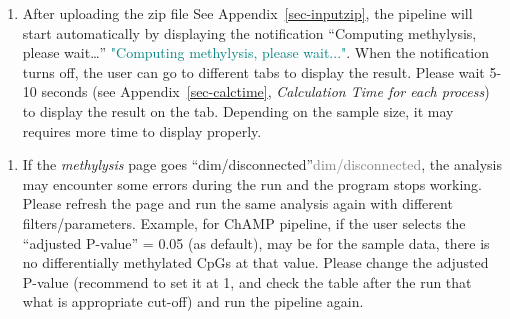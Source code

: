 \documentclass[
  a4paper,
  DIV=11,
  numbers=noendperiod,
  oneside,
  open=any]{scrreport}
\providecommand{\tightlist}{%
  \setlength{\itemsep}{0pt}\setlength{\parskip}{0pt}}\usepackage{longtable,booktabs,array}
\begin{document}
\begin{tcolorbox}[enhanced jigsaw, opacityback=0, toprule=.15mm, bottomtitle=1mm, colback=white, rightrule=.15mm, breakable, coltitle=black, colbacktitle=quarto-callout-tip-color!10!white, toptitle=1mm, arc=.35mm, colframe=quarto-callout-tip-color-frame, bottomrule=.15mm, opacitybacktitle=0.6, titlerule=0mm, leftrule=.75mm, title=\textcolor{quarto-callout-tip-color}{\faLightbulb}\hspace{0.5em}{Tip}, left=2mm]

\begin{enumerate}
\def\labelenumi{\arabic{enumi}.}
\tightlist
\item
  After uploading the zip file See Appendix~\ref{sec-inputzip}, the
  pipeline will start automatically by displaying the notification
  {``Computing methylysis, please wait\ldots{}''}
  \textcolor{teal}{"Computing methylysis, please wait..."}. When the
  notification turns off, the user can go to different tabs to display
  the result. Please wait 5-10 seconds (see Appendix~\ref{sec-calctime},
  \emph{Calculation Time for each process}) to display the result on the
  tab. Depending on the sample size, it may requires more time to
  display properly.
\end{enumerate}

\end{tcolorbox}

\begin{tcolorbox}[enhanced jigsaw, opacityback=0, toprule=.15mm, bottomtitle=1mm, colback=white, rightrule=.15mm, breakable, coltitle=black, colbacktitle=quarto-callout-tip-color!10!white, toptitle=1mm, arc=.35mm, colframe=quarto-callout-tip-color-frame, bottomrule=.15mm, opacitybacktitle=0.6, titlerule=0mm, leftrule=.75mm, title=\textcolor{quarto-callout-tip-color}{\faLightbulb}\hspace{0.5em}{Tip}, left=2mm]

\begin{enumerate}
\def\labelenumi{\arabic{enumi}.}
\setcounter{enumi}{1}
\tightlist
\item
  If the \emph{methylysis} page goes
  {``dim/disconnected''}\textcolor{gray}{dim/disconnected}, the analysis
  may encounter some errors during the run and the program stops
  working. Please refresh the page and run the same analysis again with
  different filters/parameters. Example, for ChAMP pipeline, if the user
  selects the ``adjusted P-value'' = 0.05 (as default), may be for the
  sample data, there is no differentially methylated CpGs at that value.
  Please change the adjusted P-value (recommend to set it at 1, and
  check the table after the run that what is appropriate cut-off) and
  run the pipeline again.
\end{enumerate}

\end{tcolorbox}
\end{document}
